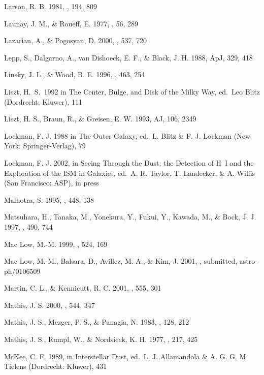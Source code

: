 \documentclass[12pt,preprint,flushrt]{aastex}
\begin{document}
\begin{thebibliography}{}
Larson, R. B. 1981, \mnras, 194, 809

Launay, J. M., \& Roueff, E.
1977, \aap, 56, 289

Lazarian, A., \& Pogosyan, D. 2000, \apj, 537, 720

Lepp, S., Dalgarno, A., van
Dishoeck, E. F., \& Black, J. H. 1988, ApJ, 329, 418

Linsky, J. L., \& Wood, B. E. 1996,
\apj, 463, 254

Liszt, H.\ S.\ 1992 in The Center, Bulge, and Disk
of the Milky Way, ed.\ Leo Blitz (Dordrecht: Kluwer),  111


Liszt, H. S., Braun,
R., \& Greisen, E. W. 1993, AJ, 106, 2349

Lockman, F. J. 1988 in The Outer Galaxy,
ed.\ L. Blitz \& F. J. Lockman (New York: Springer-Verlag), 79

Lockman, F. J. 2002, in Seeing Through
the Dust: the Detection of H~I and the Exploration of the ISM in Galaxies,
ed.\ A. R. Taylor, T. Landecker, \& A. Willis (San Francisco: ASP), in press

Malhotra, S. 1995, \apj, 448, 138

Matsuhara, H., Tanaka, M.,
Yonekura, Y., Fukui, Y., Kawada, M., \& Bock, J. J. 1997, \apj, 490, 744 

Mac Low, M.-M. 1999, \apj, 524, 169

Mac Low, M.-M., Balsara, D.,
Avillez, M. A., \& Kim, J. 2001, \apj, submitted, astro-ph/0106509

Martin, C. L., \& Kennicutt,
R. C. 2001, \apj, 555, 301

Mathis, J. S. 2000, \apj, 544, 347

Mathis, J. S., Mezger, P. S., \&
Panagia, N. 1983, \aap, 128, 212

Mathis, J. S., Rumpl, W.,
\& Nordsieck, K. H. 1977, \apj, 217, 425

McKee, C. F. 1989, in Interstellar Dust, ed.\ L. J. Allamandola
\& A. G. G. M. Tielens (Dordrecht: Kluwer),  431


\end{thebibliography}
\end{document}
